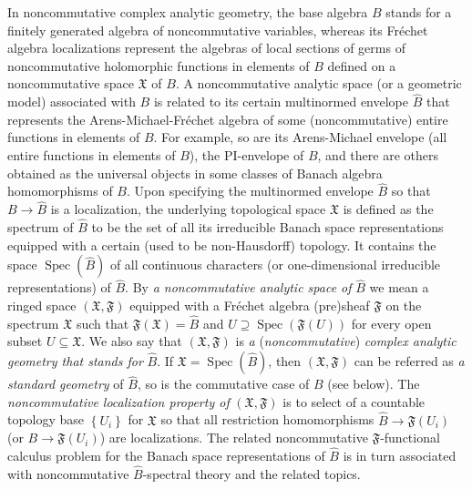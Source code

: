 \documentclass[12pt,reqno]{amsart}%
\theoremstyle{plain}
\numberwithin{theorem}{section} \numberwithin{equation}{section}
\numberwithin{lemma}{section}
\numberwithin{remark}{section}
\numberwithin{example}{section}
\numberwithin{proposition}{section}
\numberwithin{definition}{section}
\numberwithin{corollary}{section}
\begin{document}
In noncommutative complex analytic geometry, the base algebra $B$ stands for a
finitely generated algebra of noncommutative variables, whereas its
Fr\'{e}chet algebra localizations represent the algebras of local sections of
germs of noncommutative holomorphic functions in elements of $B$ defined on a
noncommutative space $\mathfrak{X}$ of $B$. A noncommutative analytic space
(or a geometric model) associated with $B$ is related to its certain
multinormed envelope $\widehat{B}$ that represents the
Arens-Michael-Fr\'{e}chet algebra of some (noncommutative) entire functions in
elements of $B$. For example, so are its Arens-Michael envelope \cite[5.2.21]%
{Hel} (all entire functions in elements of $B$), the PI-envelope \cite{Aris}
of $B$, and there are others obtained as the universal objects in some classes
of Banach algebra homomorphisms of $B$. Upon specifying the multinormed
envelope $\widehat{B}$ so that $B\rightarrow\widehat{B}$ is a localization,
the underlying topological space $\mathfrak{X}$ is defined as the spectrum of
$\widehat{B}$ to be the set of all its irreducible Banach space
representations \cite[6.2]{Hel} equipped with a certain (used to be
non-Hausdorff) topology. It contains the space $\operatorname{Spec}\left(
\widehat{B}\right)  $ of all continuous characters (or one-dimensional
irreducible representations) of $\widehat{B}$. By \textit{a noncommutative
analytic space of} $\widehat{B}$ we mean a ringed space $\left(
\mathfrak{X,F}\right)  $ equipped with a Fr\'{e}chet algebra (pre)sheaf
$\mathfrak{F}$ on the spectrum $\mathfrak{X}$ such that $\mathfrak{F}\left(
\mathfrak{X}\right)  =\widehat{B}$ and $U\supseteq\operatorname{Spec}\left(
\mathfrak{F}\left(  U\right)  \right)  $ for every open subset $U\subseteq
\mathfrak{X}$. We also say that $\left(  \mathfrak{X,F}\right)  $ is \textit{a
}(\textit{noncommutative})\textit{ complex analytic geometry that stands for}
$\widehat{B}$. If $\mathfrak{X=}\operatorname{Spec}\left(  \widehat{B}\right)
$, then $\left(  \mathfrak{X,F}\right)  $ can be referred as \textit{a
standard geometry }of $\widehat{B}$, so is the commutative case of $B$ (see
below). The \textit{noncommutative localization property of }$\left(
\mathfrak{X,F}\right)  $ is to select of a countable topology base $\left\{
U_{i}\right\}  $ for $\mathfrak{X}$ so that all restriction homomorphisms
$\widehat{B}\rightarrow\mathfrak{F}\left(  U_{i}\right)  $ (or $B\rightarrow
\mathfrak{F}\left(  U_{i}\right)  $) are localizations. The related
noncommutative $\mathfrak{F}$-functional calculus problem for the Banach space
representations of $\widehat{B}$ is in turn associated with noncommutative
$\widehat{B}$-spectral theory and the related topics.
\end{document}

